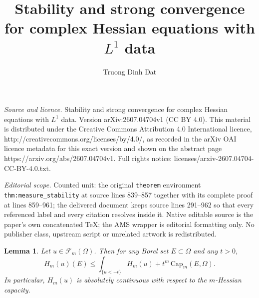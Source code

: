 \documentclass[10pt,a4paper]{amsart}
\newtheorem{lemma}[theorem]{Lemma}
\begin{document}
\title[Stability and strong convergence for complex Hessian equatio]{Stability and strong convergence for complex Hessian equations with $L^1$ data}
\author{Truong Dinh Dat}
\date{}
\maketitle
\noindent\emph{Source and licence.} Stability and strong convergence for complex Hessian equations with $L^1$ data. Version arXiv:2607.04704v1 (CC BY 4.0). This material is distributed under the Creative Commons Attribution 4.0 International licence, http://creativecommons.org/licenses/by/4.0/, as recorded in the arXiv OAI licence metadata for this exact version and shown on the abstract page https://arxiv.org/abs/2607.04704v1. Full rights notice: licenses/arxiv-2607.04704-CC-BY-4.0.txt.\par\smallskip
\noindent\textit{Editorial scope.} Counted unit: the original \texttt{theorem} environment \texttt{thm:measure\_stability} at source lines 839--857 together with its complete proof at lines 859--961; the delivered document keeps source lines 291--962 so that every referenced label and every citation resolves inside it. Native editable source is the paper's own concatenated TeX; the AMS wrapper is editorial formatting only. No publisher class, upstream script or unrelated artwork is redistributed.
	\begin{lemma}\label{lem:AC}
		Let $u\in\mathcal F_m(\Omega)$. Then for any Borel set $E\subset\Omega$ and any $t>0$,
		\[
		H_m(u)(E)
		\le
		\int_{\{u<-t\}} H_m(u)
		+
		t^m\,\mathrm{Cap}_m(E,\Omega).
		\]
		In particular, $H_m(u)$ is absolutely continuous with respect to the
		$m$-Hessian capacity.
	\end{lemma}
	
\end{document}
